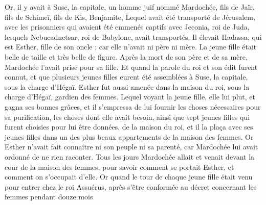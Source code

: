 \begin{multicols}{2}
Or, il y avait à Suse, la capitale, un homme juif nommé Mardochée, fils de Jaïr, fils de Schimeï, fils de Kis, Benjamite,
Lequel avait été transporté de Jérusalem, avec les prisonniers qui avaient été emmenés captifs avec Jeconia, roi de Juda, lesquels Nebucadnetsar, roi de Babylone, avait transportés.
Il élevait Hadassa, qui est Esther, fille de son oncle ; car elle n'avait ni père ni mère. La jeune fille était belle de taille et très belle de figure. Après la mort de son père et de sa mère, Mardochée l'avait prise pour sa fille.
Et quand la parole du roi et son édit furent connut, et que plusieurs jeunes filles eurent été assemblées à Suse, la capitale, sous la charge d'Hégaï. Esther fut aussi amenée dans la maison du roi, sous la charge d'Hégaï, gardien des femmes.
Lequel voyant la jeune fille, elle lui plut, et gagna ses bonnes grâces, et il s’empressa de lui fournir les choses nécessaires pour sa purification, les choses dont elle avait besoin, ainsi que sept jeunes filles qui furent choisies pour lui être données, de la maison du roi, et il la plaça avec ses jeunes filles dans un des plus beaux appartements de la maison des femmes.
Or Esther n’avait fait connaître ni son peuple ni sa parenté, car Mardochée lui avait ordonné de ne rien raconter.
Tous les jours Mardochée allait et venait devant la cour de la maison des femmes, pour savoir comment se portait Esther, et comment on s’occupait d'elle.
Or quand le tour de chaque jeune fille était venu pour entrer chez le roi Assuérus, après s’être conformée au décret concernant les femmes pendant douze mois
\end{multicols}
